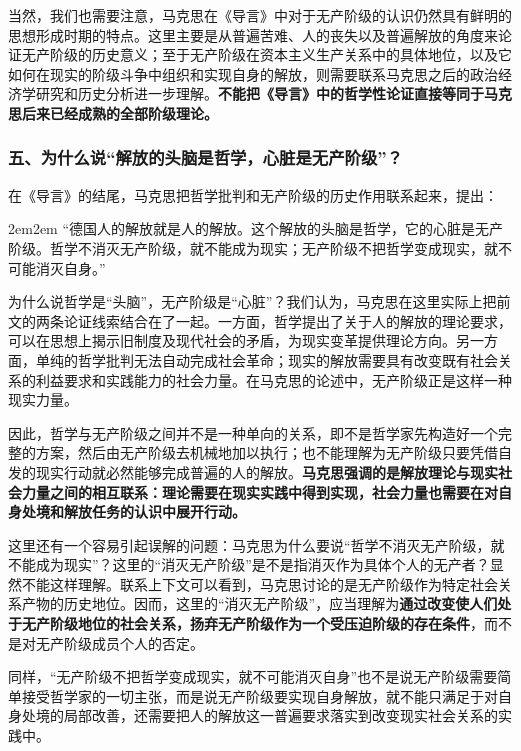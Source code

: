 \documentclass[a4paper,twoside,12pt,AutoFakeBold]{ctexart}
\begin{document}
当然，我们也需要注意，马克思在《导言》中对于无产阶级的认识仍然具有鲜明的思想形成时期的特点。这里主要是从普遍苦难、人的丧失以及普遍解放的角度来论证无产阶级的历史意义；至于无产阶级在资本主义生产关系中的具体地位，以及它如何在现实的阶级斗争中组织和实现自身的解放，则需要联系马克思之后的政治经济学研究和历史分析进一步理解。\textbf{不能把《导言》中的哲学性论证直接等同于马克思后来已经成熟的全部阶级理论。}


\subsubsection{五、为什么说“解放的头脑是哲学，心脏是无产阶级”？}

在《导言》的结尾，马克思把哲学批判和无产阶级的历史作用联系起来，提出：

\begin{adjustwidth}{2em}{2em}
\qquad\fangsong
“德国人的解放就是人的解放。这个解放的头脑是哲学，它的心脏是无产阶级。哲学不消灭无产阶级，就不能成为现实；无产阶级不把哲学变成现实，就不可能消灭自身。”
\end{adjustwidth}

为什么说哲学是“头脑”，无产阶级是“心脏”？我们认为，马克思在这里实际上把前文的两条论证线索结合在了一起。一方面，哲学提出了关于人的解放的理论要求，可以在思想上揭示旧制度及现代社会的矛盾，为现实变革提供理论方向。另一方面，单纯的哲学批判无法自动完成社会革命；现实的解放需要具有改变既有社会关系的利益要求和实践能力的社会力量。在马克思的论述中，无产阶级正是这样一种现实力量。

因此，哲学与无产阶级之间并不是一种单向的关系，即不是哲学家先构造好一个完整的方案，然后由无产阶级去机械地加以执行；也不能理解为无产阶级只要凭借自发的现实行动就必然能够完成普遍的人的解放。\textbf{马克思强调的是解放理论与现实社会力量之间的相互联系：理论需要在现实实践中得到实现，社会力量也需要在对自身处境和解放任务的认识中展开行动。}

这里还有一个容易引起误解的问题：马克思为什么要说“哲学不消灭无产阶级，就不能成为现实”？这里的“消灭无产阶级”是不是指消灭作为具体个人的无产者？显然不能这样理解。联系上下文可以看到，马克思讨论的是无产阶级作为特定社会关系产物的历史地位。因而，这里的“消灭无产阶级”，应当理解为\textbf{通过改变使人们处于无产阶级地位的社会关系，扬弃无产阶级作为一个受压迫阶级的存在条件}，而不是对无产阶级成员个人的否定。

同样，“无产阶级不把哲学变成现实，就不可能消灭自身”也不是说无产阶级需要简单接受哲学家的一切主张，而是说无产阶级要实现自身解放，就不能只满足于对自身处境的局部改善，还需要把人的解放这一普遍要求落实到改变现实社会关系的实践中。
\end{document}
